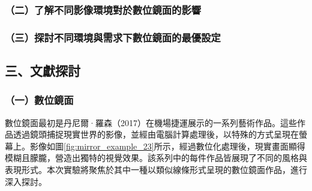 \documentclass[12pt]{article}
\begin{document}
\subsubsection{（二）了解不同影像環境對於數位鏡面的影響}
\subsubsection{（三）探討不同環境與需求下數位鏡面的最優設定}

\newpage

\subsection{三、文獻探討}

\subsubsection{（一）數位鏡面}

數位鏡面最初是丹尼爾·羅森（2017）在機場捷運展示的一系列藝術作品。這些作品透過鏡頭捕捉現實世界的影像，並經由電腦計算處理後，以特殊的方式呈現在螢幕上。影像如圖\ref{fig:mirror_example_23}所示，經過數位化處理後，現實畫面顯得模糊且朦朧，營造出獨特的視覺效果。該系列中的每件作品皆展現了不同的風格與表現形式。本次實驗將聚焦於其中一種以類似線條形式呈現的數位鏡面作品，進行深入探討。
\end{document}
